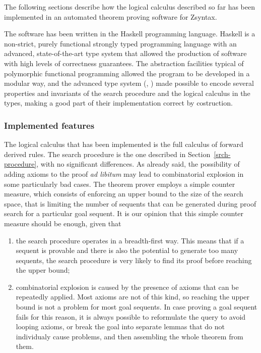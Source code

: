 The following sections describe how the logical calculus described so far has
been implemented in an automated theorem proving software for Zsyntax.

The software has been written in the Haskell programming language.
Haskell is a non-strict, purely functional strongly typed programming language
\cite{a-history-of-haskell}
with an advanced, state-of-the-art type system that allowed the production of
software with high levels of correctness guarantees.
The abstraction facilities typical of polymorphic functional programming allowed
the program to be developed in a modular way, and the advanced type system
(\cite{gadts}, \cite{dependent-haskell})
made possible to encode several properties and invariants of the search
procedure and the logical calculus in the types, making a good part of their
implementation correct by costruction.

\subsubsection{Implemented features}

The logical calculus that has been implemented is the full calculus of forward
derived rules. The search procedure is the one described in
Section~\ref{srch-procedure}, with no significant differences.  As already said,
the possibility of adding axioms to the proof \emph{ad libitum} may lead to
combinatorial explosion in some particularly bad cases.  The theorem prover
employs a simple counter measure, which consists of enforcing an upper bound to
the size of the search space, that is limiting the number of sequents that can
be generated during proof search for a particular goal sequent.  It is our
opinion that this simple counter measure should be enough, given that

\begin{enumerate}
\item the search procedure operates in a breadth-first way. This means that if a
  sequent is provable and there is also the potential to generate too many
  sequents, the search procedure is very likely to find its proof before reaching
  the upper bound;
\item combinatorial explosion is caused by the presence of axioms that can be
  repeatedly applied. Most axioms are not of this kind, so reaching the upper
  bound is not a problem for most goal sequents. In case proving a goal sequent
  fails for this reason, it is always possible to reformulate the query to avoid
  looping axioms, or break the goal into separate lemmas that do not individualy
  cause problems, and then assembling the whole theorem from them.
\end{enumerate}

